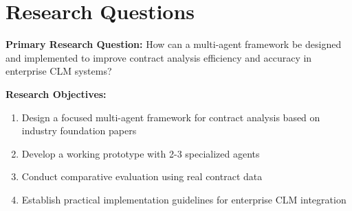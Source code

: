 
\section{Research Questions}\label{section:research_questions}

\textbf{Primary Research Question:} How can a multi-agent framework be designed and implemented to improve contract analysis efficiency and accuracy in enterprise CLM systems?
\newline
\break

\textbf{Research Objectives:}
\begin{enumerate}
    \item Design a focused multi-agent framework for contract analysis based on industry foundation papers
    \item Develop a working prototype with 2-3 specialized agents
    \item Conduct comparative evaluation using real contract data
    \item Establish practical implementation guidelines for enterprise CLM integration
\end{enumerate}
